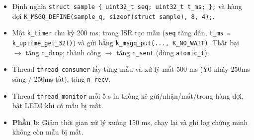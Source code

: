 \begin{tcolorbox}[
    enhanced, colback=black!2, colframe=black!60, boxrule=1pt, arc=2.5mm, drop shadow,
    attach boxed title to top left={xshift=4mm, yshift=-3mm},
    boxed title style={enhanced, colback=black!85, colframe=black!85, boxrule=1pt, arc=2.5mm, drop shadow, left=6pt, right=6pt, top=2pt, bottom=2pt},
    title=\textcolor{white}{\large\textbf{Yêu cầu đề bài (Trích phiếu bài tập)}}
]
\bfseries
\vspace{0.2cm}
\begin{itemize}
    \item Định nghĩa \texttt{struct sample \{ uint32\_t seq; uint32\_t t\_ms; \};} và hàng đợi \texttt{K\_MSGQ\_DEFINE(sample\_q, sizeof(struct sample), 8, 4);}.
    \item Một \texttt{k\_timer} chu kỳ 200 ms; trong ISR tạo mẫu (\texttt{seq} tăng dần, \texttt{t\_ms = k\_uptime\_get\_32()}) và gửi bằng \texttt{k\_msgq\_put(..., K\_NO\_WAIT)}. Thất bại $\rightarrow$ tăng \texttt{n\_drop}; thành công $\rightarrow$ tăng \texttt{n\_sent} (dùng \texttt{atomic\_t}).
    \item Thread \texttt{thread\_consumer} lấy từng mẫu và xử lý mất 500 ms (Y0 nháy 250ms sáng / 250ms tắt), tăng \texttt{n\_recv}.
    \item Thread \texttt{thread\_monitor} mỗi 5 s in thống kê gửi/nhận/mất/trong hàng đợi, bật LED3 khi có mẫu bị mất.
    \item \textbf{Phần b}: Giảm thời gian xử lý xuống 150 ms, chạy lại và ghi log chứng minh không còn mẫu bị mất.
\end{itemize}
\end{tcolorbox}

\vspace{0.3cm}
